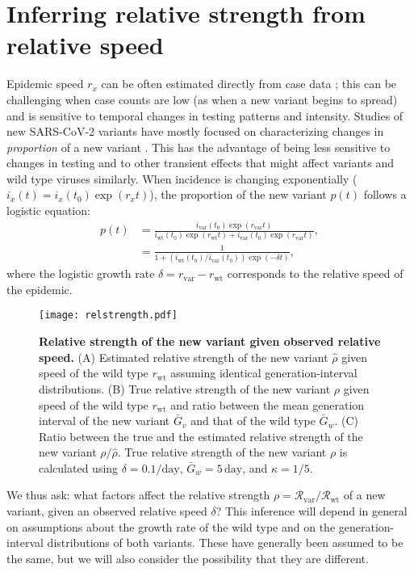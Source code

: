 \documentclass[12pt]{article}
\newcommand{\rx}[1]{\ensuremath{{r}_{#1}}\xspace}
\newcommand{\ry}[1]{\rx{\mathrm{#1}}}
\newcommand{\Rx}[1]{\ensuremath{{\mathcal R}_{#1}}\xspace}
\newcommand{\Ry}[1]{\Rx{\mathrm{#1}}}
\newcommand{\days}{\ensuremath{\, \textrm{day}}}
\newcommand{\pday}{\ensuremath{/\textrm{day}}}
\newcommand{\ix}[1]{\ensuremath{{i}_{#1}}\xspace}
\newcommand{\iy}[1]{\ix{\mathrm{#1}}}
\begin{document}
\section{Inferring relative strength from relative speed}

Epidemic speed $r_x$ can be often estimated directly from case data \citep{mills2004transmissibility,nishiura2009transmission,ma2014estimating};
this can be challenging when case counts are low (as when a new variant begins to spread) and is sensitive to temporal changes in testing patterns and intensity.
Studies of new SARS-CoV-2 variants have mostly focused on characterizing changes in \emph{proportion} of a new variant \citep{switzerland2021variant, davies2021estimated, di2021impact, leung2021early, volz2021transmission,zhao2021}.
This has the advantage of being less sensitive to changes in testing and to other transient effects that might affect variants and wild type viruses similarly.
When incidence is changing exponentially ($i_x(t) = i_x(t_0) \exp(r_x t)$), the proportion of the new variant $p(t)$ follows a logistic equation:
\begin{align}
p(t) &= \frac{\iy{var}(t_0) \exp(\ry{var} t)}{\iy{wt}(t_0) \exp(\ry{wt} t) + \iy{var}(t_0) \exp(\ry{var} t)},
\\ &= \frac{1}{1 + \left(\iy{wt}(t_0)/\iy{var}(t_0)\right) \exp(-\delta t)},
\end{align}
where the logistic growth rate $\delta = \ry{var} - \ry{wt}$ corresponds to the relative speed of the epidemic.

\begin{figure}[!th]
\texttt{[image: relstrength.pdf]}
\caption{
\textbf{Relative strength of the new variant given observed relative speed.}
(A) Estimated relative strength of the new variant $\hat{\rho}$ given speed of the wild type
$\ry{wt}$ assuming identical generation-interval distributions.
(B) True relative strength of the new variant $\rho$ given speed of the wild type $\ry{wt}$ and ratio between the mean generation interval of the new variant $\bar{G}_v$ and that of the wild type $\bar{G}_w$.
(C) Ratio between the true and the estimated relative strength of the new variant $\rho/\hat{\rho}$.
True relative strength of the new variant $\rho$ is calculated using $\delta=0.1\pday$, $\bar{G}_w = 5\days$, and $\kappa = 1/5$.
}
\label{fig:relstrength}
\end{figure}

We thus ask: what factors affect the relative strength $\rho = \Ry{var}/\Ry{wt}$ of a new variant, given an observed relative speed $\delta$?
This inference will depend in general on assumptions about the growth rate of the wild type and on the generation-interval distributions of both variants.
These have generally been assumed to be the same, but we will also consider the possibility that they are different.
\end{document}
